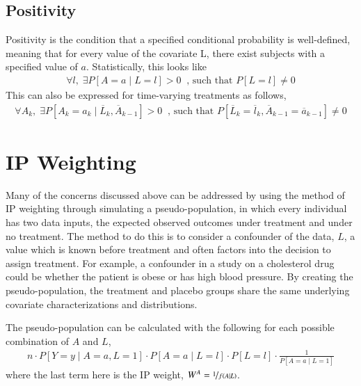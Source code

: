       
\subsection{Positivity} 
Positivity is the condition that a specified conditional probability is well-defined, meaning that for every value of the covariate L, there exist subjects with a specified value of $a$.\cite{hernan2006estimating}  Statistically, this looks like 
\begin{align}
\forall l, \;  \exists P[A=a \mid L=l] > 0 \;\;  \text{, such that } P[L=l] \neq 0
\end{align} 
This can also be expressed for time-varying treatments as follows, 
\begin{align} 
\forall A_k, \; \exists P[A_k = a_k \mid \overline{L}_{k}, \overline{A}_{k-1}] > 0 \;\;   \text{, such that } P[\overline{L}_k = \overline{l}_k, \overline{A}_{k-1} = \overline{a}_{k-1} ] \neq 0
\end{align} 





\section{IP Weighting} \label{IP Weighting} 
Many of the concerns discussed above can be addressed by using the method of IP weighting through simulating a pseudo-population, in which every individual has two data inputs, the expected observed outcomes under treatment and under no treatment.  The method to do this is to consider a confounder of the data, $L$, a value which is known before treatment and often factors into the decision to assign treatment.  For example, a confounder in a study on a cholesterol drug could be whether the patient is obese or has high blood pressure.  By creating the pseudo-population, the treatment and placebo groups share the same underlying covariate characterizations and distributions. 

The pseudo-population can be calculated with the following for each possible combination of $A$ and $L$, 
\begin{align} \label{eq:1}
n\cdot P[Y=y \mid A = a, L= 1] \cdot P[A=a \mid L=l]  \cdot P[L=l] \cdot \frac{1}{P[A = a \mid L = 1]} \end{align}  
where the last term here is the IP weight, $W^{A} = \nicefrac{1}{f(A\mid L)}$.  


